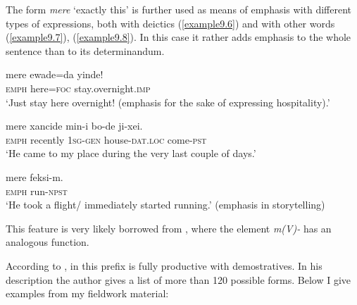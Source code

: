 \documentclass[output=paper,colorlinks,citecolor=brown]{langscibook}
\begin{document}
The form \textit{mere} ‘exactly this’ is further used as means of emphasis with different types of expressions, both with deictics (\ref{example9.6}) and with other words (\ref{example9.7}), (\ref{example9.8}).  In this case it rather adds emphasis to the whole sentence than to its determinandum.

\ea
    \label{example9.6}
    \gll mere 		ewade=da 	yinde!\\
    \textsc{emph} 	here=\textsc{foc} 	stay.overnight.\textsc{imp}\\
    \glt `Just stay here overnight! (emphasis for the sake of expressing hospitality).'\\
    \z

\ea
    \label{example9.7}
    \gll mere 	xancide 	min-i 		bo-de	 		ji-xei.\\
    \textsc{emph}	recently	1\textsc{sg-gen}	house-\textsc{dat.loc} 	come-\textsc{pst}\\
    \glt `He came to my place during the very last couple of days.'\\
    \z

\ea
    \label{example9.8}
    \gll mere 	feksi-m.\\
    \textsc{emph} run-\textsc{npst}\\
    \glt `He took a flight/ immediately started running.' (emphasis in storytelling)\\
    \z

\noindent This feature is very likely borrowed from , where the element \textit{m(V)-} has an analogous function.


According to \citet[148--151]{Bayančoγtu2002}, in  this prefix is fully productive with demostratives. In his description the author gives a list of more than 120 possible forms. Below I give examples from my fieldwork material:
\end{document}
